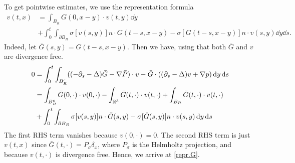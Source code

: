\documentclass[abstracton, paper=a4, fontsize=11pt,DIV=12,bibliography=totoc]{scrartcl}
\begin{document}
To get pointwise estimates, we use the representation formula
\begin{align} \label{repr.G}
       v(t,x) &= \int_{B_R} G(0,x-y) \cdot  v(t,y) \dd y \\
       &+  \int_0^t \int_{\partial B_R} \sigma[v(s,y)]n \cdot G(t-s,x-y) - \sigma[G(t-s, x-y)] n \cdot v(s,y) \dd y \dd s.
\end{align}
Indeed, let $\bar G(s,y) =  G(t-s,x-y)$. Then we have, using that both $\bar G$ and $v$ are divergence free.
\begin{align*}
    0 &= \int_0^t \int_{B_R^c} ((-\partial_s - \Delta) \bar G - \nabla \bar P) \cdot v - \bar G \cdot ((\partial_s - \Delta) v + \nabla p) \, \mathrm{d} y \, \mathrm{d} s \\
    &=  \int_{B_R^c}  \bar G(0,\cdot) \cdot v(0,\cdot)- \int_{\mathbb{R}^3}  \bar G(t,\cdot) \cdot v(t,\cdot) +  \int_{ B_R} \bar G(t,\cdot)  \cdot  v(t,\cdot)  \\
    &+ \int_0^t \int_{\partial B_R} \sigma[v(s,y)]n \cdot \bar G(s,y) - \sigma[\bar G(s, y)] n \cdot v(s,y) \, \mathrm{d} y \, \mathrm{d} s
\end{align*}
The first RHS term vanishes because $v(0,\cdot) = 0$. The second RHS term is just $v(t,x)$ since $\bar G(t,\cdot) = P_\sigma \delta_x$, where $P_\sigma$ is the Helmholtz projection, and because $v(t,\cdot)$ is divergence free. Hence, we arrive at \eqref{repr.G}.
\end{document}
